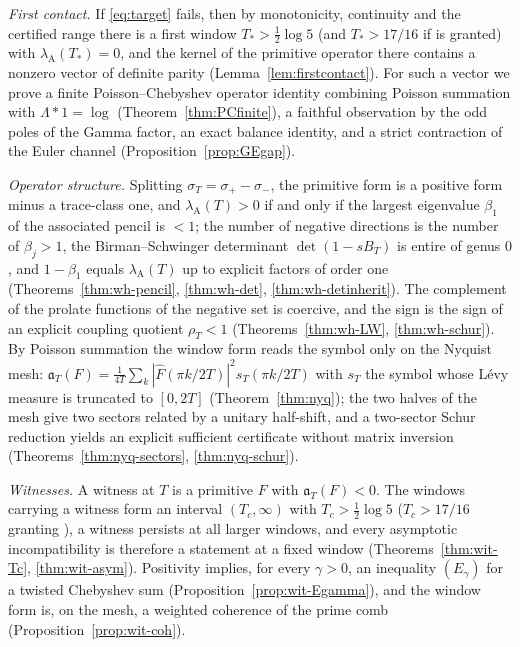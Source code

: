 \documentclass[11pt]{amsart}
\theoremstyle{definition}
\theoremstyle{remark}
\newcommand{\lamA}{\lambda_{\mathrm A}(T)}
\newcommand{\sT}{\sigma_T}
\newcommand{\Fh}{\widehat F}
\begin{document}
\emph{First contact.} If \eqref{eq:target} fails, then by monotonicity, continuity and the certified range
there is a first window $T_*>\frac12\log5$ (and $T_*>17/16$ if \cite[Thm.~B]{Liu2026} is granted) with $\lambda_{\mathrm A}(T_*)=0$, and the kernel of the
primitive operator there contains a nonzero vector of definite parity (Lemma~\ref{lem:firstcontact}). For
such a vector we prove a finite Poisson--Chebyshev operator identity combining Poisson summation with
$\Lambda*1=\log$ (Theorem~\ref{thm:PCfinite}), a faithful observation by the odd poles of the Gamma factor,
an exact balance identity, and a strict contraction of the Euler channel (Proposition~\ref{prop:GEgap}).

\emph{Operator structure.} Splitting $\sT=\sigma_+-\sigma_-$, the primitive form is a positive form minus a
trace-class one, and $\lamA>0$ if and only if the largest eigenvalue $\beta_1$ of the associated pencil is
$<1$; the number of negative directions is the number of $\beta_j>1$, the Birman--Schwinger determinant
$\det(1-sB_T)$ is entire of genus $0$, and $1-\beta_1$ equals $\lamA$ up to explicit factors of order one
(Theorems~\ref{thm:wh-pencil}, \ref{thm:wh-det}, \ref{thm:wh-detinherit}). The complement of the prolate
functions of the negative set is coercive, and the sign is the sign of an explicit coupling quotient
$\rho_T<1$ (Theorems~\ref{thm:wh-LW}, \ref{thm:wh-schur}). By Poisson summation the window form reads the
symbol only on the Nyquist mesh: $\mathfrak a_T(F)=\frac1{4T}\sum_k|\Fh(\pi k/2T)|^2s_T(\pi k/2T)$ with $s_T$ the
symbol whose L\'evy measure is truncated to $[0,2T]$ (Theorem~\ref{thm:nyq}); the two halves of the mesh give
two sectors related by a unitary half-shift, and a two-sector Schur reduction yields an explicit sufficient
certificate without matrix inversion (Theorems~\ref{thm:nyq-sectors}, \ref{thm:nyq-schur}).

\emph{Witnesses.} A witness at $T$ is a primitive $F$ with $\mathfrak a_T(F)<0$. The windows carrying a
witness form an interval $(T_c,\infty)$ with $T_c>\frac12\log5$ ($T_c>17/16$ granting \cite{Liu2026}), a witness persists at all larger windows,
and every asymptotic incompatibility is therefore a statement at a fixed window
(Theorems~\ref{thm:wit-Tc}, \ref{thm:wit-asym}). Positivity implies, for every $\gamma>0$, an inequality
$(E_\gamma)$ for a twisted Chebyshev sum (Proposition~\ref{prop:wit-Egamma}), and the window form is, on the mesh,
a weighted coherence of the prime comb (Proposition~\ref{prop:wit-coh}).
\end{document}
